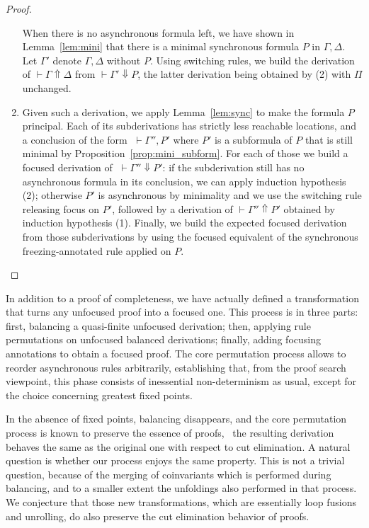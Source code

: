\begin{proof}
\begin{enumerate}
When there is no asynchronous formula left, we have shown
in Lemma~\ref{lem:mini} that there is a minimal synchronous formula $P$
in $\Gamma,\Delta$.
Let $\Gamma'$ denote $\Gamma,\Delta$ without $P$.
Using switching rules,
we build the derivation of $\vdash\Gamma\Uparrow\Delta$
from $\vdash\Gamma'\Downarrow P$,
the latter derivation being obtained by (2) with $\Pi$ unchanged.

\item
Given such a derivation,
we apply Lemma~\ref{lem:sync} to make the formula $P$ principal.
Each of its subderivations has strictly less reachable locations,
and a conclusion of the form $\;\vdash\Gamma'', P'$
where $P'$ is a subformula of $P$
that is still minimal by Proposition~\ref{prop:mini_subform}.
For each of those we build a focused derivation of
$\;\vdash\Gamma''\Downarrow P'$:
if the subderivation still has no asynchronous formula in its conclusion,
we can apply induction hypothesis (2);
otherwise $P'$ is asynchronous by minimality
and we use the switching rule releasing focus on $P'$,
followed by a derivation of $\vdash\Gamma''\Uparrow P'$
obtained by induction hypothesis (1).
Finally, we build the expected focused derivation from those
subderivations by using the focused equivalent of the
synchronous freezing-annotated rule applied on $P$.
\end{enumerate}
\vspace{-0.6cm}\end{proof}

In addition to a proof of completeness, we have actually defined
a transformation that turns any unfocused proof into a focused one.
This process is in three parts:
first, balancing a quasi-finite unfocused derivation;
then, applying rule permutations on unfocused balanced derivations;
finally, adding focusing annotations to obtain a focused proof.
The core permutation process allows to reorder asynchronous rules
arbitrarily, establishing that, from the proof search viewpoint,
this phase consists of inessential non-determinism as usual,
except for the choice concerning greatest fixed points.

In the absence of fixed points, balancing disappears,
and the core permutation process is known to preserve the essence of
proofs, \ie\ the resulting derivation behaves the same as the original
one with respect to cut elimination.
A natural question is whether our process enjoys the same property.
This is not a trivial question,
because of the merging of coinvariants which is performed during balancing,
and to a smaller extent the unfoldings also performed in that process.
We conjecture that those new transformations, which are essentially
loop fusions and unrolling, do also preserve the
cut elimination behavior of proofs.

